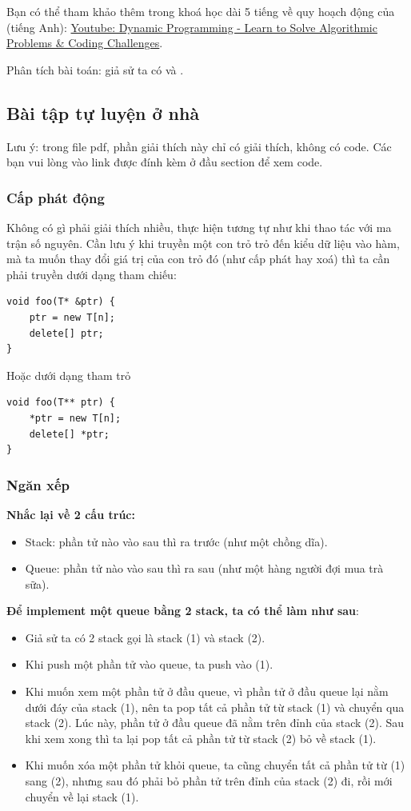 \documentclass[main.tex]{subfiles}
\begin{document}
Bạn có thể tham khảo thêm trong khoá học dài 5 tiếng về quy hoạch động của  (tiếng Anh): \href{https://www.youtube.com/watch?v=oBt53YbR9Kk}{Youtube: Dynamic Programming - Learn to Solve Algorithmic Problems \& Coding Challenges}.

Phân tích bài toán: giả sử ta có  và .



\subsection{Bài tập tự luyện ở nhà}
Lưu ý: trong file pdf, phần giải thích này chỉ có giải thích, không có code. Các bạn vui lòng vào link được đính kèm ở đầu section để xem code.
\subsubsection{Cấp phát động}
Không có gì phải giải thích nhiều, thực hiện tương tự như khi thao tác với ma trận số nguyên.
Cần lưu ý khi truyền một con trỏ trỏ đến kiểu dữ liệu  vào hàm, mà ta muốn thay đổi giá trị của con trỏ đó (như cấp phát hay xoá) thì ta cần phải truyền dưới dạng tham chiếu: 
\begin{verbatim}
void foo(T* &ptr) {
    ptr = new T[n];
    delete[] ptr;
}
\end{verbatim}
Hoặc dưới dạng tham trỏ
\begin{verbatim}
void foo(T** ptr) {
    *ptr = new T[n];
    delete[] *ptr;
}
\end{verbatim}

\subsubsection{Ngăn xếp}
\textbf{Nhắc lại về 2 cấu trúc:}
\begin{itemize}
    \item Stack: phần tử nào vào sau thì ra trước (như một chồng dĩa).
    \item Queue: phần tử nào vào sau thì ra sau (như một hàng người đợi mua trà sữa).
\end{itemize}

\textbf{Để implement một queue bằng 2 stack, ta có thể làm như sau}:
\begin{itemize}
    \item Giả sử ta có 2 stack gọi là stack (1) và stack (2).
    \item Khi push một phần tử vào queue, ta push vào (1).
    \item Khi muốn xem một phần tử ở đầu queue, vì phần tử ở đầu queue lại nằm dưới đáy của stack (1), nên ta pop tất cả phần tử từ stack (1) và chuyển qua stack (2). Lúc này, phần tử ở đầu queue đã nằm trên đỉnh của stack (2). Sau khi xem xong thì ta lại pop tất cả phần tử từ stack (2) bỏ về stack (1).
    \item Khi muốn xóa một phần tử khỏi queue, ta cũng chuyển tất cả phần tử từ (1) sang (2), nhưng sau đó phải bỏ phần tử trên đỉnh của stack (2) đi, rồi mới chuyển về lại stack (1).
\end{itemize}
\end{document}

